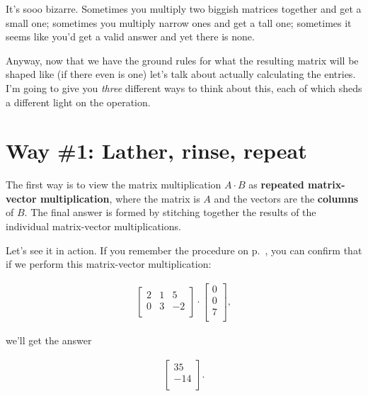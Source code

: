 It's sooo bizarre. Sometimes you multiply two biggish matrices together and get
a small one; sometimes you multiply narrow ones and get a tall one; sometimes
it seems like you'd get a valid answer and yet there is none.

Anyway, now that we have the ground rules for what the resulting matrix will be
shaped like (if there even is one) let's talk about actually calculating the
entries. I'm going to give you \textit{three} different ways to think about
this, each of which sheds a different light on the operation.

\section{Way \#1: Lather, rinse, repeat}


The first way is to view the matrix multiplication $A \cdot B$ as
\textbf{repeated matrix-vector multiplication}, where the matrix is $A$ and the
vectors are the \textbf{columns} of $B$. The final answer is formed by
stitching together the results of the individual matrix-vector multiplications.

Let's see it in action. If you remember the procedure on
p.~\pageref{matrixVectorMultiplication}, you can confirm that if we perform
this matrix-vector multiplication:

\vspace{-.15in}
\begin{align*}
\begin{bmatrix}
2 & 1 & 5 \\
0 & 3 & -2 \\
\end{bmatrix} \cdot
\begin{bmatrix}
0 \\ 0 \\ 7 \\
\end{bmatrix},
\end{align*}
\vspace{-.15in}

we'll get the answer

\vspace{-.15in}
\begin{align*}
\begin{bmatrix}
35 \\ -14 \\
\end{bmatrix}.
\end{align*}
\vspace{-.15in}

